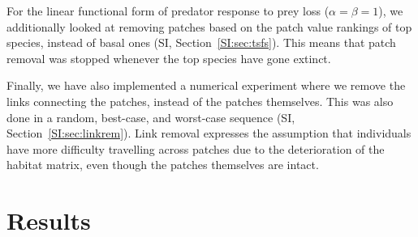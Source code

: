 \documentclass[11pt]{article}
\newcommand{\SI}{SI}
\begin{document}
For the linear functional form of predator response to prey loss ($\alpha = \beta = 1$), we additionally looked at removing patches based on the patch value rankings of top species, instead of basal ones (\SI, Section~\ref{SI:sec:tsfs}). This means that patch removal was stopped whenever the top species have gone extinct.

Finally, we have also implemented a numerical experiment where we remove the links connecting the patches, instead of the patches themselves. This was also done in a random, best-case, and worst-case sequence (\SI, Section~\ref{SI:sec:linkrem}). Link removal expresses the assumption that individuals have more difficulty travelling across patches due to the deterioration of the habitat matrix, even though the patches themselves are intact.


\section{Results} \label{sec:results}
\end{document}
